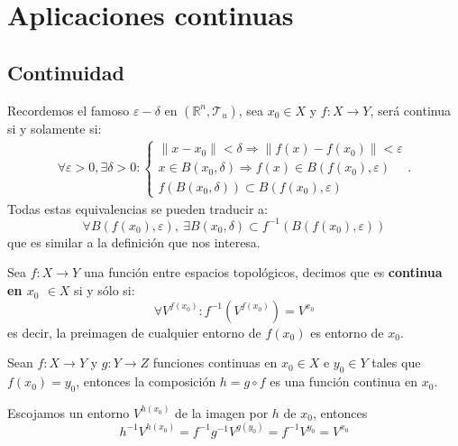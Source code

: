 \chapter{Aplicaciones continuas}%
\label{cha:aplicaciones_continuas}

\section{Continuidad}%
\label{sec:continuidad}
Recordemos el famoso $\varepsilon-\delta$ en $\left( \mathbb{R}^n, \mathcal{T}_u \right)$, sea $x_0 \in X$ y $f : X \rightarrow Y$, será continua si y solamente si: 
\begin{gather*}        
\forall \varepsilon > 0, \exists \delta > 0: 
\begin{cases}
    \lVert x - x_0 \rVert < \delta \Rightarrow \lVert f\left( x \right) - f\left( x_0 \right) \rVert < \varepsilon \\
    x \in B\left( x_0, \delta \right) \Rightarrow f\left( x \right) \in B\left( f\left( x_0 \right), \varepsilon \right) \\
    f\left( B\left( x_0, \delta \right) \right) \subset B\left( f\left( x_0 \right), \varepsilon \right) 
\end{cases}
.\end{gather*}
Todas estas equivalencias se pueden traducir a:
\[
\boxed{\forall B\left( f\left( x_0 \right), \varepsilon \right),\ \exists B\left( x_0, \delta \right) \subset f^{-1}\left( B\left( f\left( x_0 \right), \varepsilon \right) \right)} 
\]
que es similar a la definición que nos interesa.

\begin{defi}[Continuidad]
Sea $f: X \rightarrow Y$ una función entre espacios topológicos, decimos que es \textbf{continua en $x_0$ $\in X$} si y sólo si:
\[
\forall V^{f\left( x_0 \right)} :  f^{-1}\left( V^{f\left( x_0 \right)} \right) = V^{x_0} 
\]
es decir, la preimagen de cualquier entorno de $f(x_0)$ es entorno de $x_0$.
\end{defi}

\begin{prop}
Sean $f:X \rightarrow Y$ y $g: Y \rightarrow Z$ funciones continuas en $x_0\in X$ e $y_0\in Y$ tales que $f(x_0) = y_0$, entonces la composición $h = g \circ f$ es una función continua en $x_0$.
\end{prop}
\begin{demo}
Escojamos un entorno $V^{h\left( x_0 \right)}$ de la imagen por $h$ de $x_0$, entonces
\[
h^{-1} V^{h\left( x_0 \right)} = f^{-1}g^{-1}V^{g\left( y_0 \right)} = f^{-1} V^{y_0} = V^{x_0}
\]
\end{demo}


